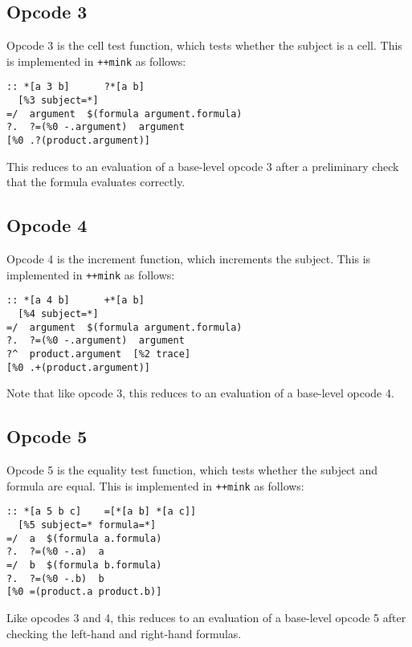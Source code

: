 \documentclass[twoside]{article}
\begin{document}
\subsection{Opcode 3}

Opcode 3 is the cell test function, which tests whether the subject is a cell.  This is implemented in \lstinline[style=inlinecode]{++mink} as follows:

\begin{lstlisting}[style=listingcode]
:: *[a 3 b]      ?*[a b]
  [%3 subject=*]
=/  argument  $(formula argument.formula)
?.  ?=(%0 -.argument)  argument
[%0 .?(product.argument)]
\end{lstlisting}

\noindent
This reduces to an evaluation of a base-level opcode 3 after a preliminary check that the formula evaluates correctly.

\subsection{Opcode 4}

Opcode 4 is the increment function, which increments the subject.  This is implemented in \lstinline[style=inlinecode]{++mink} as follows:

\begin{lstlisting}[style=listingcode]
:: *[a 4 b]      +*[a b]
  [%4 subject=*]
=/  argument  $(formula argument.formula)
?.  ?=(%0 -.argument)  argument
?^  product.argument  [%2 trace]
[%0 .+(product.argument)]
\end{lstlisting}

\noindent
Note that like opcode 3, this reduces to an evaluation of a base-level opcode 4.

\subsection{Opcode 5}

Opcode 5 is the equality test function, which tests whether the subject and formula are equal.  This is implemented in \lstinline[style=inlinecode]{++mink} as follows:

\begin{lstlisting}[style=listingcode]
:: *[a 5 b c]    =[*[a b] *[a c]]
  [%5 subject=* formula=*]
=/  a  $(formula a.formula)
?.  ?=(%0 -.a)  a
=/  b  $(formula b.formula)
?.  ?=(%0 -.b)  b
[%0 =(product.a product.b)]
\end{lstlisting}

\noindent
Like opcodes 3 and 4, this reduces to an evaluation of a base-level opcode 5 after checking the left-hand and right-hand formulas.
\end{document}
